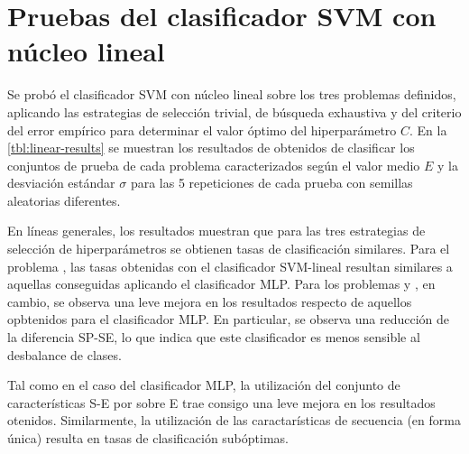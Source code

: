 %
%
%
\section{Pruebas del clasificador SVM con núcleo lineal}
%
Se probó el clasificador SVM con núcleo lineal sobre los tres
problemas definidos, aplicando las estrategias de selección trivial,
de búsqueda exhaustiva y del criterio del error empírico para
determinar el valor óptimo del hiperparámetro $C$.
En la \autoref{tbl:linear-results} se muestran los resultados de
obtenidos de clasificar los conjuntos de prueba de cada problema
caracterizados según el valor medio $E$ y la desviación estándar
$\sigma$ para las 5 repeticiones de cada prueba con semillas
aleatorias diferentes.

En líneas generales, los resultados muestran que para las tres
estrategias de selección de hiperparámetros se obtienen tasas de
clasificación similares.
Para el problema \tripletsvm{}, las tasas obtenidas con el
clasificador SVM-lineal resultan similares a aquellas conseguidas
aplicando el clasificador MLP.
Para los problemas \mipred{} y \micropred{}, en cambio, se observa una
leve mejora en los resultados respecto de aquellos opbtenidos para el
clasificador MLP.
En particular, se observa una reducción de la diferencia SP-SE, lo que
indica que este clasificador es menos sensible al desbalance de
clases.

Tal como en el caso del clasificador MLP, la utilización del conjunto
de características S-E por sobre E trae consigo una leve mejora en los
resultados otenidos.
Similarmente, la utilización de las caractarísticas de secuencia (en
forma única) resulta en tasas de clasificación subóptimas.
